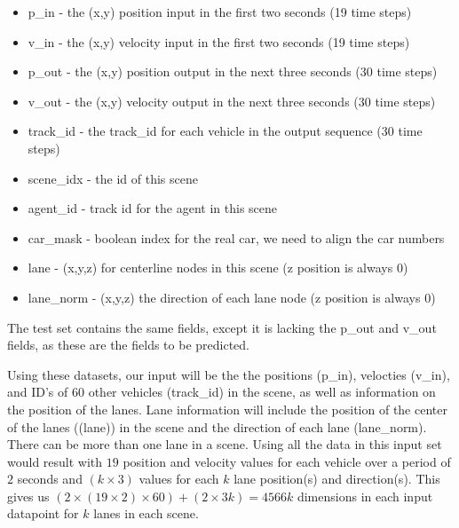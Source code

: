 \documentclass{article}
\begin{document}
        \begin{itemize}            
            \item {\selectfont p\_in} - the (x,y) position input in the first two seconds (19 time steps)
            \item {\selectfont v\_in} - the (x,y) velocity input in the first two seconds (19 time steps)
            \item {\selectfont p\_out} - the (x,y) position output in the next three seconds (30 time steps)
            \item {\selectfont v\_out} - the (x,y) velocity output in the next three seconds (30 time steps)
            \item {\selectfont track\_id} - the track\_id for each vehicle in the output sequence (30 time steps)
            \item {\selectfont scene\_idx} - the id of this scene
            \item {\selectfont agent\_id} - track id for the agent in this scene
            \item {\selectfont car\_mask} - boolean index for the real car, we need to align the car numbers
            \item {\selectfont lane} - (x,y,z) for centerline nodes in this scene (z position is always $0$)
            \item {\selectfont lane\_norm} - (x,y,z) the direction of each lane node (z position is always $0$)
        \end{itemize}

        The test set contains the same fields, except it is lacking the {\selectfont p\_out} and
        {\selectfont v\_out} fields, as these are the fields to be predicted. 
        
        Using these datasets, our input will be the the positions ({\selectfont p\_in}), velocties 
        ({\selectfont v\_in}), and ID's of $60$ other vehicles ({\selectfont track\_id}) 
        in the scene, as well as information on the position of the lanes. Lane information will include the position
        of the center of the lanes (({\selectfont lane})) in the scene and the direction of each lane 
        ({\selectfont lane\_norm}). There can be more than one lane in a scene.
        Using all the data in this input set would result with $19$ position and velocity
        values for each vehicle over a period of $2$ seconds and $\left( k \times 3 \right)$ values for each $k$ lane position(s) 
        and direction(s). This gives us 
        $\left( 2 \times \left( 19 \times 2 \right) \times 60 \right) + \left( 2 \times 3k \right) = 4566k$ dimensions in each
        input datapoint for $k$ lanes in each scene.
\end{document}
